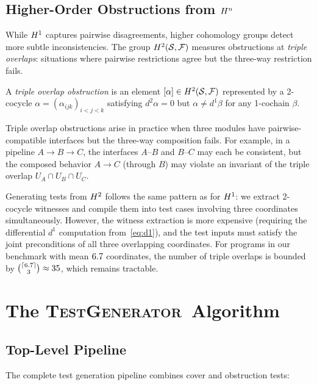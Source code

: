 \documentclass[11pt]{article}
\newcommand{\TestGen}{\textsc{TestGenerator}}
\begin{document}
\subsection{Higher-Order Obstructions from $H^{n}$}\label{sec:higher-obstr}

While $H^{1}$ captures pairwise disagreements, higher cohomology groups
detect more subtle inconsistencies.  The group $H^{2}(\mathcal{S}, \mathcal{F})$
measures obstructions at \emph{triple overlaps}: situations where pairwise
restrictions agree but the three-way restriction fails.

\begin{definition}\label{def:triple-obstr}
A \emph{triple overlap obstruction} is an element
$[\alpha] \in H^{2}(\mathcal{S}, \mathcal{F})$ represented by a 2-cocycle
$\alpha = (\alpha_{ijk})_{i<j<k}$ satisfying $d^2 \alpha = 0$ but
$\alpha \neq d^1 \beta$ for any 1-cochain $\beta$.
\end{definition}

Triple overlap obstructions arise in practice when three modules have
pairwise-compatible interfaces but the three-way composition fails.
For example, in a pipeline $A \to B \to C$, the interfaces $A$--$B$ and
$B$--$C$ may each be consistent, but the composed behavior $A \to C$
(through $B$) may violate an invariant of the triple overlap
$U_A \cap U_B \cap U_C$.

Generating tests from $H^{2}$ follows the same pattern as for
$H^{1}$: we extract 2-cocycle witnesses and compile them into test
cases involving three coordinates simultaneously.  However, the witness
extraction is more expensive (requiring the differential $d^1$ computation
from~\eqref{eq:d1}), and the test inputs must satisfy the joint
preconditions of all three overlapping coordinates.  For programs in
our benchmark with mean $6.7$ coordinates, the number of
triple overlaps is bounded by $\binom{\lceil6.7\rceil}{3}
\approx 35$, which remains tractable.

\section{The \TestGen\ Algorithm}\label{sec:algorithm}

\subsection{Top-Level Pipeline}
The complete test generation pipeline combines cover and obstruction tests:
\end{document}
